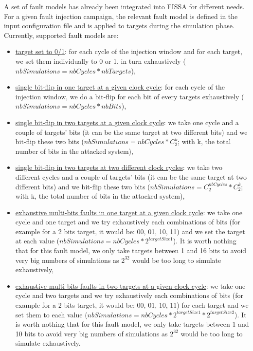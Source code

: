 A set of fault models has already been integrated into FISSA for different needs. For a given fault injection campaign, the relevant fault model is defined in the input configuration file and is applied to targets during the simulation phase.
Currently, supported fault models are:
\begin{itemize}
    \justifying
    \item \underline{target set to 0/1}: for each cycle of the injection window and for each target, we set them individually to 0 or 1, in turn exhaustively ($nbSimulations = nbCycles * nbTargets$),
    \item \underline{single bit-flip in one target at a given clock cycle}: for each cycle of the injection window, we do a bit-flip for each bit of every targets exhaustively ($nbSimulations = nbCycles * nbBits$),
    \item \underline{single bit-flip in two targets at a given clock cycle}: we take one cycle and a couple of targets' bits (it can be the same target at two different bits) and we bit-flip these two bits ($nbSimulations = nbCycles * C_{2}^k$; with k, the total number of bits in the attacked system),
    \item \underline{single bit-flip in two targets at two different clock cycles}:  we take two different cycles and a couple of targets' bits (it can be the same target at two different bits) and we bit-flip these two bits ($nbSimulations = C_{2}^{nbCycles} * C_{2}^k$; with k, the total number of bits in the attacked system),
    \item \underline{exhaustive multi-bits faults in one target at a given clock cycle}: we take one cycle and one target and we try exhaustively each combinations of bits (for example for a 2 bits target, it would be: 00, 01, 10, 11) and we set the target at each value ($nbSimulations = nbCycles * 2^{targetSize1}$). It is worth nothing that for this fault model, we only take targets between 1 and 16 bits to avoid very big numbers of simulations as $2^{32}$ would be too long to simulate exhaustively,
    \item \underline{exhaustive multi-bits faults in two targets at a given clock cycle}: we take one cycle and two targets and we try exhaustively each combinations of bits (for example for a 2 bits target, it would be: 00, 01, 10, 11) for each target and we set them to each value ($nbSimulations = nbCycles * 2^{targetSize1}* 2^{targetSize2}$). It is worth nothing that for this fault model, we only take targets between 1 and 10 bits to avoid very big numbers of simulations as $2^{32}$ would be too long to simulate exhaustively.
\end{itemize}

